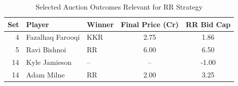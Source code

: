 \begin{table}[H]
\centering
\caption{Selected Auction Outcomes Relevant for RR Strategy}
\begin{tabular}{rllcc}
\toprule
Set & Player & Winner & Final Price (Cr) & RR Bid Cap \\
\midrule
4 & Fazalhaq Farooqi & KKR & 2.75 & 1.86 \\
5 & Ravi Bishnoi & RR & 6.00 & 6.50 \\
14 & Kyle Jamieson & -- & -- & -1.00 \\
14 & Adam Milne & RR & 2.00 & 3.25 \\
\bottomrule
\end{tabular}
\end{table}
